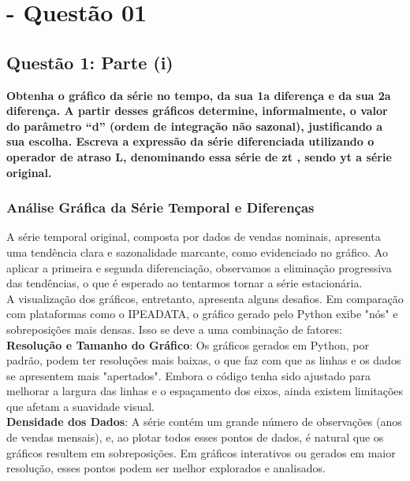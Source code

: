 \documentclass[a4paper, 12pt]{article}
\begin{document}
\newpage
\section{- Questão 01}


\subsection{Questão 1: Parte (i)}
\textbf{Obtenha o gráfico da série no tempo, da sua 1a diferença e da sua 2a diferença. A partir
desses gráficos determine, informalmente, o valor do parâmetro “d” (ordem de integração não
sazonal), justificando a sua escolha. Escreva a expressão da série diferenciada utilizando o
operador de atraso L, denominando essa série de zt
, sendo yt
 a série original.} \\

\subsubsection{Análise Gráfica da Série Temporal e Diferenças}

A série temporal original, composta por dados de vendas nominais, apresenta uma tendência clara e sazonalidade marcante, como evidenciado no gráfico. Ao aplicar a primeira e segunda diferenciação, observamos a eliminação progressiva das tendências, o que é esperado ao tentarmos tornar a série estacionária.\\

A visualização dos gráficos, entretanto, apresenta alguns desafios. Em comparação com plataformas como o IPEADATA, o gráfico gerado pelo Python exibe "nós" e sobreposições mais densas. Isso se deve a uma combinação de fatores:\\

\textbf{Resolução e Tamanho do Gráfico}: Os gráficos gerados em Python, por padrão, podem ter resoluções mais baixas, o que faz com que as linhas e os dados se apresentem mais "apertados". Embora o código tenha sido ajustado para melhorar a largura das linhas e o espaçamento dos eixos, ainda existem limitações que afetam a suavidade visual.\\

\textbf{Densidade dos Dados}: A série contém um grande número de observações (anos de vendas mensais), e, ao plotar todos esses pontos de dados, é natural que os gráficos resultem em sobreposições. Em gráficos interativos ou gerados em maior resolução, esses pontos podem ser melhor explorados e analisados.\\
\end{document}
